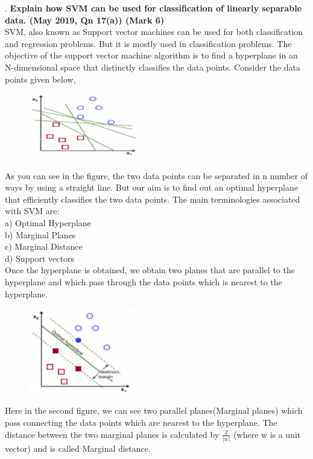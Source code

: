 .
\textbf{\textcolor{LightMagenta}{Explain how SVM can be used for classification of linearly separable data. (May 2019, Qn 17(a)) \hfill (Mark 6)}} \\[5pt]
SVM, also known as Support vector machines can be used for both classification and
regression problems. But it is mostly used in classification problems. The objective of
the support vector machine algorithm is to find a hyperplane in an N-dimensional space
that distinctly classifies the data points. Consider the data points given below,
 \begin{figure}[htp]
    \centering
    \includegraphics[width=5cm]{Images/A37_img1.png}
 \end{figure}
As you can see in the figure, the two data points can be separated in n number of ways
by using a straight line. But our aim is to find out an optimal hyperplane that efficiently
classifies the two data points. 
The main terminologies associated with  SVM are:\\
a) Optimal Hyperplane\\
b) Marginal Planes\\
c) Marginal Distance\\
d) Support vectors\\

Once the hyperplane is obtained, we obtain two planes that are parallel to the hyperplane and which pass through the data points which is nearest to the hyperplane.
 \begin{figure}[htp]
    \centering
    \includegraphics[width=5cm]{Images/A37_img2.png}
 \end{figure}
 Here in the second figure, we can see two parallel planes(Marginal planes) which pass connecting the data points which are nearest to the hyperplane. The distance between the two marginal planes is calculated by \(\frac{2}{{\vert}w{\vert}} \)
(where w is a unit vector) and is called Marginal distance.
 
